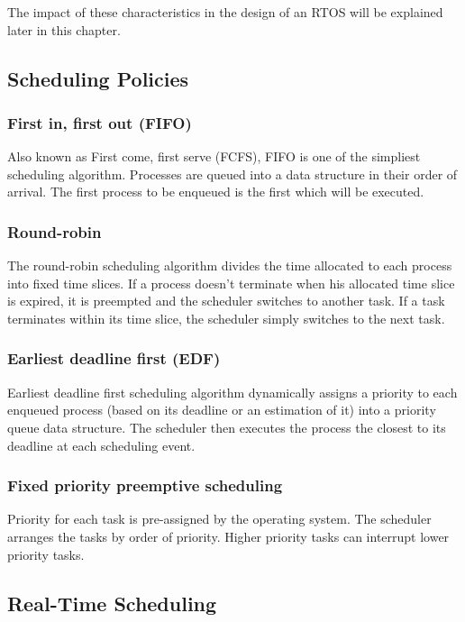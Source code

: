 The impact of these characteristics in the design of an RTOS will be explained later in this chapter.

\subsection{Scheduling Policies}

\subsubsection{First in, first out (FIFO)}
Also known as First come, first serve (FCFS), FIFO is one of the simpliest scheduling algorithm.
Processes are queued into a data structure in their order of arrival.
The first process to be enqueued is the first which will be executed.

\subsubsection{Round-robin}
The round-robin scheduling algorithm divides the time allocated to each process into fixed time slices.
If a process doesn't terminate when his allocated time slice is expired, it is preempted and the scheduler switches to another task.
If a task terminates within its time slice, the scheduler simply switches to the next task.

\subsubsection{Earliest deadline first (EDF)}
Earliest deadline first scheduling algorithm dynamically assigns a priority
    to each enqueued process (based on its deadline or an estimation of it) into a priority queue data structure.
The scheduler then executes the process the closest to its deadline at each scheduling event.

\subsubsection{Fixed priority preemptive scheduling}
Priority for each task is pre-assigned by the operating system.
The scheduler arranges the tasks by order of priority.
Higher priority tasks can interrupt lower priority tasks.

\subsection{Real-Time Scheduling}

